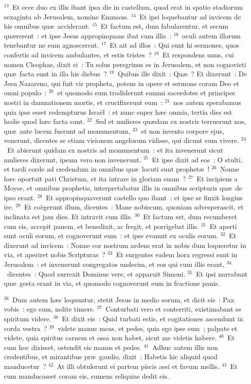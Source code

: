 ${}^{13}$~Et ecce duo ex illis ibant ipsa die in castellum, quod erat in spatio stadiorum sexaginta ab Jerusalem, nomine Emmaus.
${}^{14}$~Et ipsi loquebantur ad invicem de his omnibus qu\ae\ acciderant.
${}^{15}$~Et factum est, dum fabularentur, et secum qu\ae rerent~: et ipse Jesus appropinquans ibat cum illis~:
${}^{16}$~oculi autem illorum tenebantur ne eum agnoscerent.
${}^{17}$~Et ait ad illos~: Qui sunt hi sermones, quos confertis ad invicem ambulantes, et estis tristes~?
${}^{18}$~Et respondens unus, cui nomen Cleophas, dixit ei~: Tu solus peregrinus es in Jerusalem, et non cognovisti qu\ae\ facta sunt in illa his diebus~?
${}^{19}$~Quibus ille dixit~: Qu\ae~? Et dixerunt~: De Jesu Nazareno, qui fuit vir propheta, potens in opere et sermone coram Deo et omni populo~:
${}^{20}$~et quomodo eum tradiderunt summi sacerdotes et principes nostri in damnationem mortis, et crucifixerunt eum~:
${}^{21}$~nos autem sperabamus quia ipse esset redempturus Isra\"el~: et nunc super h\ae c omnia, tertia dies est hodie quod h\ae c facta sunt.
${}^{22}$~Sed et mulieres qu\ae dam ex nostris terruerunt nos, qu\ae\ ante lucem fuerunt ad monumentum,
${}^{23}$~et non invento corpore ejus, venerunt, dicentes se etiam visionem angelorum vidisse, qui dicunt eum vivere.
${}^{24}$~Et abierunt quidam ex nostris ad monumentum~: et ita invenerunt sicut mulieres dixerunt, ipsum vero non invenerunt.
${}^{25}$~Et ipse dixit ad eos~: O stulti, et tardi corde ad credendum in omnibus qu\ae\ locuti sunt prophet\ae~!
${}^{26}$~Nonne h\ae c oportuit pati Christum, et ita intrare in gloriam suam~?
${}^{27}$~Et incipiens a Moyse, et omnibus prophetis, interpretabatur illis in omnibus scripturis qu\ae\ de ipso erant.
${}^{28}$~Et appropinquaverunt castello quo ibant~: et ipse se finxit longius ire.
${}^{29}$~Et co\"egerunt illum, dicentes~: Mane nobiscum, quoniam advesperascit, et inclinata est jam dies. Et intravit cum illis.
${}^{30}$~Et factum est, dum recumberet cum eis, accepit panem, et benedixit, ac fregit, et porrigebat illis.
${}^{31}$~Et aperti sunt oculi eorum, et cognoverunt eum~: et ipse evanuit ex oculis eorum.
${}^{32}$~Et dixerunt ad invicem~: Nonne cor nostrum ardens erat in nobis dum loqueretur in via, et aperiret nobis Scripturas~?
${}^{33}$~Et surgentes eadem hora regressi sunt in Jerusalem~: et invenerunt congregatos undecim, et eos qui cum illis erant,
${}^{34}$~dicentes~: Quod surrexit Dominus vere, et apparuit Simoni.
${}^{35}$~Et ipsi narrabant qu\ae\ gesta erant in via, et quomodo cognoverunt eum in fractione panis.


${}^{36}$~Dum autem h\ae c loquuntur, stetit Jesus in medio eorum, et dicit eis~: Pax vobis~: ego sum, nolite timere.
${}^{37}$~Conturbati vero et conterriti, existimabant se spiritum videre.
${}^{38}$~Et dixit eis~: Quid turbati estis, et cogitationes ascendunt in corda vestra~?
${}^{39}$~videte manus meas, et pedes, quia ego ipse sum~; palpate et videte, quia spiritus carnem et ossa non habet, sicut me videtis habere.
${}^{40}$~Et cum hoc dixisset, ostendit eis manus et pedes.
${}^{41}$~Adhuc autem illis non credentibus, et mirantibus pr\ae\ gaudio, dixit~: Habetis hic aliquid quod manducetur~?
${}^{42}$~At illi obtulerunt ei partem piscis assi et favum mellis.
${}^{43}$~Et cum manducasset coram eis, sumens reliquias dedit eis.



